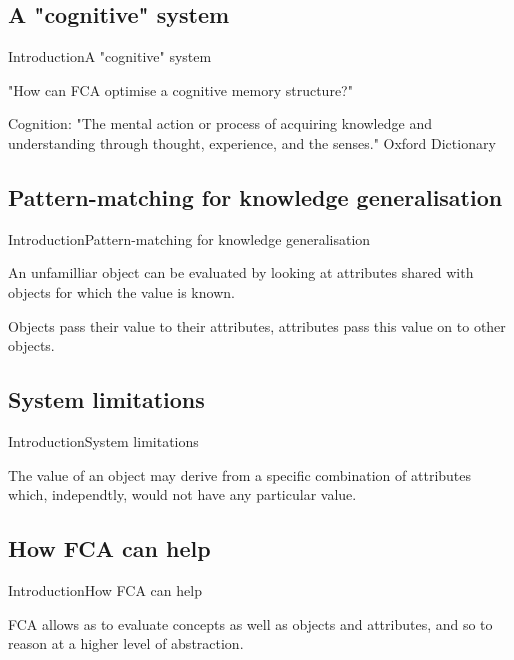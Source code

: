 \subsection{A "cognitive" system}
\begin{frame}{Introduction}{A "cognitive" system}

"How can FCA  optimise a cognitive memory  structure?"

Cognition:
"The mental action or process of acquiring knowledge and understanding through thought, experience, and the senses."
Oxford Dictionary

\end{frame}

\subsection{Pattern-matching for knowledge generalisation}
\begin{frame}{Introduction}{Pattern-matching for knowledge generalisation}

An unfamilliar object can be evaluated by looking at attributes shared with objects for which the value is known.

Objects pass their value to their attributes, attributes pass this value on to other objects.

\end{frame}

\subsection{System limitations}
\begin{frame}{Introduction}{System limitations}

The value of an object may derive from a specific combination of attributes which, independtly, would not have 
any particular value.

\end{frame}

\subsection{How FCA can help}
\begin{frame}{Introduction}{How FCA can help}

FCA allows as to evaluate concepts as well as objects and attributes, and so to reason at a higher level of
abstraction.

\end{frame}